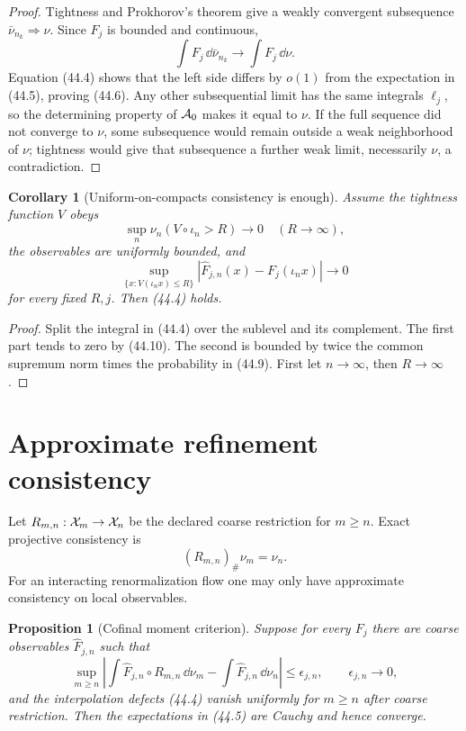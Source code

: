 \documentclass[11pt]{article}
\newtheorem{proposition}[theorem]{Proposition}
\newtheorem{corollary}[theorem]{Corollary}
\theoremstyle{remark}
\begin{document}
\begin{proof}
Tightness and Prokhorov's theorem give a weakly convergent
subsequence \(\bar\nu_{n_k}\Rightarrow\nu\).  Since \(F_j\) is
bounded and continuous,
\[
 \int F_j\,\dd\bar\nu_{n_k}\longrightarrow
 \int F_j\,\dd\nu.                                      \tag{44.8}
\]
Equation (44.4) shows that the left side differs by \(o(1)\) from
the expectation in (44.5), proving (44.6).  Any other subsequential
limit has the same integrals \(\ell_j\), so the determining property
of \({\cal A}_0\) makes it equal to \(\nu\).  If the full sequence
did not converge to \(\nu\), some subsequence would remain outside a
weak neighborhood of \(\nu\); tightness would give that subsequence
a further weak limit, necessarily \(\nu\), a contradiction.
\end{proof}

\begin{corollary}[Uniform-on-compacts consistency is enough]
\label{cor:v15v44-compact-consistency}
Assume the tightness function \(V\) obeys
\[
 \sup_n\nu_n(V\circ\iota_n>R)\longrightarrow0
 \quad(R\to\infty),                                     \tag{44.9}
\]
the observables are uniformly bounded, and
\[
 \sup_{\{x:V(\iota_nx)\leq R\}}
 |\widehat F_{j,n}(x)-F_j(\iota_nx)|
 \longrightarrow0                                      \tag{44.10}
\]
for every fixed \(R,j\).  Then (44.4) holds.
\end{corollary}

\begin{proof}
Split the integral in (44.4) over the sublevel and its complement.
The first part tends to zero by (44.10).  The second is bounded by
twice the common supremum norm times the probability in (44.9).
First let \(n\to\infty\), then \(R\to\infty\).
\end{proof}

\section{Approximate refinement consistency}

Let \(R_{m,n}:{\cal X}_m\to{\cal X}_n\) be the declared coarse
restriction for \(m\geq n\).  Exact projective consistency is
\[
 (R_{m,n})_\#\nu_m=\nu_n.                               \tag{44.11}
\]
For an interacting renormalization flow one may only have
approximate consistency on local observables.

\begin{proposition}[Cofinal moment criterion]
\label{prop:v15v44-cofinal}
Suppose for every \(F_j\) there are coarse observables
\(\widehat F_{j,n}\) such that
\[
 \sup_{m\geq n}
 \left|
 \int\widehat F_{j,n}\circ R_{m,n}\,\dd\nu_m
 -\int\widehat F_{j,n}\,\dd\nu_n
 \right|
 \leq\epsilon_{j,n},\qquad\epsilon_{j,n}\to0,            \tag{44.12}
\]
and the interpolation defects (44.4) vanish uniformly for
\(m\geq n\) after coarse restriction.  Then the expectations in
(44.5) are Cauchy and hence converge.
\end{proposition}
\end{document}
